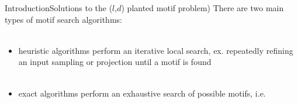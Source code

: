 \documentclass[pdf,xcolor={dvipsnames}]{beamer}
\begin{document}
	\begin{frame}{Introduction}{Solutions to the ($l$,$d$) planted motif problem)}
		There are two main types of motif search algorithms:\\ \ \\
		\begin{itemize}
		\item { heuristic algorithms} 
		perform an iterative local search, ex. repeatedly refining an input sampling or projection until a motif is found
		\\ \ \\
		\item { exact algorithms}
		perform an exhaustive search of possible motifs, i.e. 
		\end{itemize}
		\end{frame}
\end{document}
